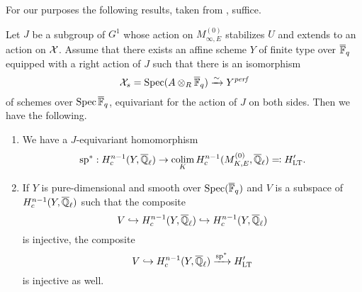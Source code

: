 \documentclass[../main.tex]{subfiles}
\begin{document}
For our purposes the following results, taken from \cite[Corollary
4.6]{mieda2016geometric}, suffice.
\begin{thm}\label{thm:MiedaAppliedToLTT}
  Let $J$ be a subgroup of $G^1$ whose action on $M_{\infty, E}^{(0)}$ 
  stabilizes $U$ and extends to an action on $\mathcal{X}$. Assume that there exists an
  affine scheme $Y$ of finite type over ${\overline {\mathbb{F}}_q}$ equipped with a right action of 
  $J$ such that there is an isomorphism
  \begin{equation*}
    \mathcal{X}_s = \operatorname{Spec}(A \otimes_{R} {\overline {\mathbb{F}}_q}) \xrightarrow{\sim} Y^{\mathit{perf}}
  \end{equation*}
  of schemes over $\operatorname{Spec} {\overline {\mathbb{F}}_q}$, equivariant for the action of $J$ on both sides.
  Then we have the following.
  \begin{enumerate}
    \item We have a $J$-equivariant homomorphism
      \begin{equation*}
        \mathrm{sp}^*: H_c^{n-1}(Y, \overline {\mathbb{Q}}_\ell) \to \operatorname*{colim}_K H_c^{n-1}
        (M_{K, E}^{(0)}, \overline {\mathbb{Q}}_\ell) \eqcolon H_{\mathrm{LT}}'.
      \end{equation*}
    \item If $Y$ is pure-dimensional and smooth over $\operatorname{Spec}({\overline {\mathbb{F}}_q})$
      and $V$ is a subspace of $H^{n-1}_c(Y, \overline {\mathbb{Q}}_\ell)$ such that the
      composite 
      $$V \hookrightarrow H^{n-1}_c(Y, \overline {\mathbb{Q}}_\ell) \hookrightarrow H^{n-1}_c(Y, \overline {\mathbb{Q}}_\ell)$$
      is injective, the composite
      \begin{equation*}
        V \hookrightarrow H^{n-1}_c(Y, \overline {\mathbb{Q}}_\ell) \xrightarrow{\mathrm{sp}^*} H_{\mathrm{LT}}'
      \end{equation*}
      is injective as well.
  \end{enumerate}
\end{thm}


\end{document}
